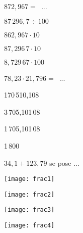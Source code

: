  \begin{QCM}
\begin{GroupeQCM}
     \begin{exercice}
      $872,967 =$ ...
      \begin{ChoixQCM}{4}
      \item $87\,296,7 \div 100$
      \item $862,967 \cdot10$
      \item $87,296\,7 \cdot 10$
      \item $8,729\,67 \cdot 100$
      \end{ChoixQCM}
      \begin{corrige}
   \end{corrige}
    \end{exercice}
    
     \begin{exercice}
      $78,23 \cdot 21,796 =$ ...
      \begin{ChoixQCM}{4}
      \item 170\,510,108
      \item 3\,705,101\,08
      \item 1\,705,101\,08
      \item 1\,800
      \end{ChoixQCM}
      \begin{corrige}
   \end{corrige}
    \end{exercice}
    
     \begin{exercice}
      $34,1 + 123,79$ se pose ...
      \begin{ChoixQCM}{4}
      \item 
      
      \texttt{[image: frac1]}
      \item 
      
      \texttt{[image: frac2]}
      \item 
      
      \texttt{[image: frac3]}
      \item 
      
      \texttt{[image: frac4]}
      \end{ChoixQCM}
      \begin{corrige}
   \end{corrige}
    \end{exercice}


\end{GroupeQCM}
\end{QCM}
